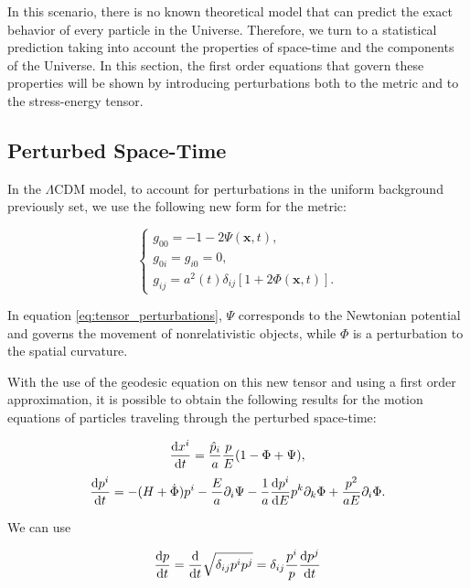 \documentclass[openany,a4paper,12pt,oneside]{book}
\begin{document}
\begin{spacing}{1.5}
In this scenario, there is no known theoretical model that can predict the exact behavior of every particle in the Universe. Therefore, we turn to a statistical prediction taking into account the properties of space-time and the components of the Universe. In this section, the first order equations that govern these properties will be shown by introducing perturbations both to the metric and to the stress-energy tensor. 

\subsection{Perturbed Space-Time}

In the $\Lambda$CDM model, to account for perturbations in the uniform background previously set, we use the following new form for the metric:

\begin{equation}\label{eq:tensor_perturbations}
\begin{cases}
    g_{00}=-1-2\Psi(\mathbf{x},t),\\
    g_{0i}=g_{i0}=0,\\
    g_{ij}=a^2(t)\delta_{ij}[1+2\Phi(\mathbf{x}, t)].
\end{cases}
\end{equation}

In equation \eqref{eq:tensor_perturbations}, $\Psi$ corresponds to the Newtonian potential and governs the movement of nonrelativistic objects\cite{dodelson2020modern}, while $\Phi$ is a perturbation to the spatial curvature.

With the use of the geodesic equation on this new tensor and using a first order approximation, it is possible to obtain the following results for the motion equations of particles traveling through the perturbed space-time:

\begin{equation}\label{ch2:dxidt}
    \dv{x^i}{t}=\frac{\hat{p}_i}{a}\frac{p}{E}(1-\Phi+\Psi),
\end{equation}
\begin{equation}\label{ch2:dpidt}
    \dv{p^i}{t}=-(H+\dot{\Phi})p^i-\frac{E}{a}\partial_i\Psi-\frac{1}{a}\dv{p^i}{E}p^k\partial_k\Phi+\frac{p^2}{aE}\partial_i\Phi.
\end{equation}

We can use

\begin{equation}
    \dv{p}{t}=\dv{}{t}\sqrt{\delta_{ij}p^i p^j}=\delta_{ij}\frac{p^i}{p}\dv{p^j}{t}
\end{equation}


\end{spacing}
\end{document}
